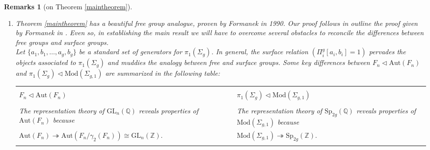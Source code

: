 \documentclass[a4paper]{amsproc}
\theoremstyle{TheoremNum}
\theoremstyle{Theorembold}
\theoremstyle{TheoremboldDef}
\theoremstyle{TheoremboldRem}
\newtheorem*{remarks}{Remarks}
\theoremstyle{TheoremboldRem}
\begin{document}
\begin{remarks}[on Theorem \ref{maintheorem}]\ \\
\vspace{-.5cm}
\begin{enumerate}[label=\arabic*.,leftmargin=1.5cm]
\item  Theorem \ref{maintheorem} has a beautiful free group analogue, proven by Formanek in 1990. Our proof follows in outline the proof given by Formanek in \cite{Formanek}. Even so, in establishing the main result we will have to overcome several obstacles to reconcile the differences between free groups and surface groups.\\
 Let $\{a_1,b_1,\dots, a_g,b_g\}$ be a standard set of generators for ${\pi_1(\Sigma_g)}$. In general, the surface relation $(\Pi_i^g[a_i, b_i]=1)$ pervades the objects associated to ${\pi_1(\Sigma_g)}$ and muddies the analogy between free and surface groups. Some key differences between $F_n\triangleleft\text{Aut}(F_n)$ and ${\pi_1(\Sigma_g)}\triangleleft{\text{Mod}(\Sigma_{g,1})}$ are summarized in the following table:
 
 \hspace{-2.5cm}\begin{tabular}[h]{p{6.8cm}p{.8cm}p{6.7cm}}
 &&\\
 $F_n\triangleleft\text{Aut}(F_n)$  && ${\pi_1(\Sigma_g)}\triangleleft{\text{Mod}(\Sigma_{g,1})}$ \\
 \hline &&\\ The representation theory of ${\text{GL}_{n}({\mathbb{Q}})}$ reveals properties of $\text{Aut}(F_n)$ because &&
  The representation theory of ${\text{Sp}_{2g}({\mathbb{Q}})}$ reveals properties of ${\text{Mod}(\Sigma_{g,1})}$ because\\ $\text{Aut}(F_n)\twoheadrightarrow \text{Aut}(F_n/\gamma_2(F_n))\cong {\text{GL}_{n}({\mathbb{Z}})}.$ && ${\text{Mod}(\Sigma_{g,1})}\twoheadrightarrow{\text{Sp}_{2g}({\mathbb{Z}})}.$\\
 &&\\


\end{tabular}
\end{enumerate}
\end{remarks}
\end{document}
